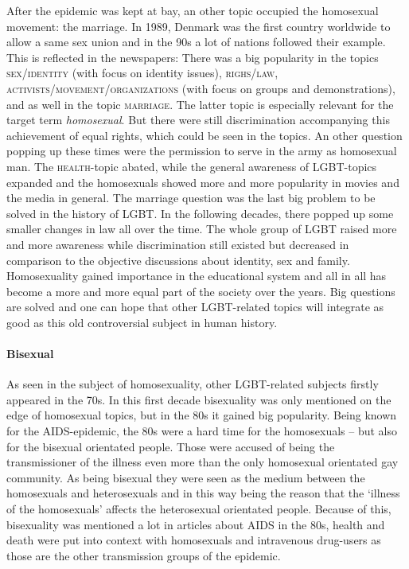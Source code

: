 \documentclass[10pt,a4paper,twocolumn]{scrartcl}
\begin{document}
After the epidemic was kept at bay, an other topic occupied the homosexual movement: the marriage. In 1989, Denmark was the first country worldwide to allow a same sex union and in the 90s a lot of nations followed their example. This is reflected in the newspapers: There was a big popularity in the topics \textsc{sex/identity} (with focus on identity issues), \textsc{righs/law}, \textsc{activists/movement/organizations} (with focus on groups and demonstrations), and as well in the topic \textsc{marriage}. The latter topic is especially relevant for the target term \textit{homosexual}. But there were still discrimination accompanying this achievement of equal rights, which could be seen in the topics. An other question popping up these times were the permission to serve in the army as homosexual man. The \textsc{health}-topic abated, while the general awareness of LGBT-topics expanded and the homosexuals showed more and more popularity in movies and the media in general.
The marriage question was the last big problem to be solved in the history of LGBT. In the following decades, there popped up some smaller changes in law all over the time. The whole group of LGBT raised more and more awareness while discrimination still existed but decreased in comparison to the objective discussions about identity, sex and family. Homosexuality gained importance in the educational system and all in all has become a more and more equal part of the society over the years. Big questions are solved and one can hope that other LGBT-related topics will integrate as good as this old controversial subject in human history.

\paragraph*{Bisexual} As seen in the subject of homosexuality, other LGBT-related subjects firstly appeared in the 70s. In this first decade bisexuality was only mentioned on the edge of homosexual topics, but in the 80s it gained big popularity. Being known for the AIDS-epidemic, the 80s were a hard time for the homosexuals – but also for the bisexual orientated people. Those were accused of being the transmissioner of the illness even more than the only homosexual orientated gay community. As being bisexual they were seen as the medium between the homosexuals and heterosexuals and in this way being the reason that the `illness of the homosexuals' affects the heterosexual orientated people. Because of this, bisexuality was mentioned a lot in articles about AIDS in the 80s, health and death were put into context with homosexuals and intravenous drug-users as those are the other transmission groups of the epidemic.
\end{document}
